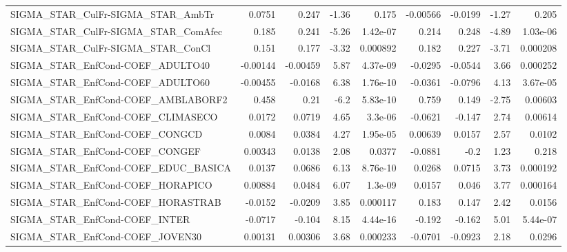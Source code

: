 \begin{tabular}{lrrrrrrrr}
SIGMA\_STAR\_CulFr-SIGMA\_STAR\_AmbTr     &      0.0751 &        0.247 &    -1.36 &    0.175 &   -0.00566 &     -0.0199 &        -1.27 &         0.205 \\
SIGMA\_STAR\_CulFr-SIGMA\_STAR\_ComAfec   &       0.185 &        0.241 &    -5.26 & 1.42e-07 &      0.214 &       0.248 &        -4.89 &      1.03e-06 \\
SIGMA\_STAR\_CulFr-SIGMA\_STAR\_ConCl     &       0.151 &        0.177 &    -3.32 & 0.000892 &      0.182 &       0.227 &        -3.71 &      0.000208 \\
SIGMA\_STAR\_EnfCond-COEF\_ADULTO40      &    -0.00144 &     -0.00459 &     5.87 & 4.37e-09 &    -0.0295 &     -0.0544 &         3.66 &      0.000252 \\
SIGMA\_STAR\_EnfCond-COEF\_ADULTO60      &    -0.00455 &      -0.0168 &     6.38 & 1.76e-10 &    -0.0361 &     -0.0796 &         4.13 &      3.67e-05 \\
SIGMA\_STAR\_EnfCond-COEF\_AMBLABORF2    &       0.458 &         0.21 &     -6.2 & 5.83e-10 &      0.759 &       0.149 &        -2.75 &       0.00603 \\
SIGMA\_STAR\_EnfCond-COEF\_CLIMASECO     &      0.0172 &       0.0719 &     4.65 &  3.3e-06 &    -0.0621 &      -0.147 &         2.74 &       0.00614 \\
SIGMA\_STAR\_EnfCond-COEF\_CONGCD        &      0.0084 &       0.0384 &     4.27 & 1.95e-05 &    0.00639 &      0.0157 &         2.57 &        0.0102 \\
SIGMA\_STAR\_EnfCond-COEF\_CONGEF        &     0.00343 &       0.0138 &     2.08 &   0.0377 &    -0.0881 &        -0.2 &         1.23 &         0.218 \\
SIGMA\_STAR\_EnfCond-COEF\_EDUC\_BASICA   &      0.0137 &       0.0686 &     6.13 & 8.76e-10 &     0.0268 &      0.0715 &         3.73 &      0.000192 \\
SIGMA\_STAR\_EnfCond-COEF\_HORAPICO      &     0.00884 &       0.0484 &     6.07 &  1.3e-09 &     0.0157 &       0.046 &         3.77 &      0.000164 \\
SIGMA\_STAR\_EnfCond-COEF\_HORASTRAB     &     -0.0152 &      -0.0209 &     3.85 & 0.000117 &      0.183 &       0.147 &         2.42 &        0.0156 \\
SIGMA\_STAR\_EnfCond-COEF\_INTER         &     -0.0717 &       -0.104 &     8.15 & 4.44e-16 &     -0.192 &      -0.162 &         5.01 &      5.44e-07 \\
SIGMA\_STAR\_EnfCond-COEF\_JOVEN30       &     0.00131 &      0.00306 &     3.68 & 0.000233 &    -0.0701 &     -0.0923 &         2.18 &        0.0296 \\

\end{tabular}

